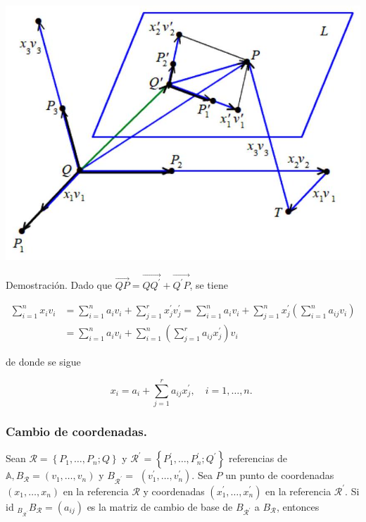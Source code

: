 \documentclass[12pt, a4paper, ones, notitlepage, openany,titlepage]{article}
\begin{document}
\begin{center}
\includegraphics[max width=\textwidth]{2023_03_01_7659aec5e35f9a9b2d3cg-14}
\end{center}

Demostración. Dado que $\overrightarrow{Q P}=\overrightarrow{Q Q^{\prime}}+\overrightarrow{Q^{\prime} P}$, se tiene

$$
\begin{aligned}
\sum_{i=1}^{n} x_{i} v_{i} & =\sum_{i=1}^{n} a_{i} v_{i}+\sum_{j=1}^{r} x_{j}^{\prime} v_{j}^{\prime}=\sum_{i=1}^{n} a_{i} v_{i}+\sum_{j=1}^{n} x_{j}^{\prime}\left(\sum_{i=1}^{n} a_{i j} v_{i}\right) \\
& =\sum_{i=1}^{n} a_{i} v_{i}+\sum_{i=1}^{n}\left(\sum_{j=1}^{r} a_{i j} x_{j}^{\prime}\right) v_{i}
\end{aligned}
$$

de donde se sigue

$$
x_{i}=a_{i}+\sum_{j=1}^{r} a_{i j} x_{j}^{\prime}, \quad i=1, \ldots, n \text {. }
$$

\subsubsection{Cambio de coordenadas.}
Sean $\mathcal{R}=\left\{P_{1}, \ldots, P_{n} ; Q\right\}$ y $\mathcal{R}^{\prime}=\left\{P_{1}^{\prime}, \ldots, P_{n}^{\prime} ; Q^{\prime}\right\}$ referencias de $\mathbb{A}, B_{\mathcal{R}}=\left(v_{1}, \ldots, v_{n}\right)$ y $B_{\mathcal{R}^{\prime}}=$ $\left(v_{1}^{\prime}, \ldots, v_{n}^{\prime}\right)$. Sea $P$ un punto de coordenadas $\left(x_{1}, \ldots, x_{n}\right)$ en la referencia $\mathcal{R}$ y coordenadas $\left(x_{1}^{\prime}, \ldots, x_{n}^{\prime}\right)$ en la referencia $\mathcal{R}^{\prime}$. Si id ${ }_{B_{\mathcal{R}^{\prime}}} B_{\mathcal{R}}=\left(a_{i j}\right)$ es la matriz de cambio de base de $B_{\mathcal{R}^{\prime}}$ a $B_{\mathcal{R}}$, entonces
\end{document}
